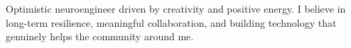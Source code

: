 Optimistic neuroengineer driven by creativity and positive energy. 
I believe in long-term resilience, meaningful collaboration, and building 
technology that genuinely helps the community around me.